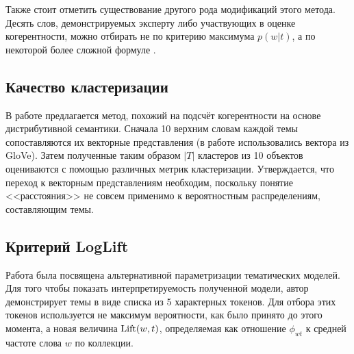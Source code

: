 Также стоит отметить существование другого рода модификаций этого метода. Десять слов, демонстрируемых эксперту либо участвующих в оценке когерентности, можно отбирать не по критерию максимума $p(w|t)$, а по некоторой более сложной формуле \cite{Blei_lafferty,ldavis2014,boydcare,frex}.





\subsection{Качество кластеризации}

В работе \cite{krasnov19clustering} предлагается метод, похожий на подсчёт когерентности на основе дистрибутивной семантики. Сначала 10 верхним словам каждой темы сопоставляются их векторные представления (в работе использовались вектора из GloVe). Затем полученные таким образом $|T|$ кластеров из 10 объектов оцениваются с помощью различных метрик кластеризации. Утверждается, что переход к векторным представлениям необходим, поскольку понятие <<расстояния>> не совсем применимо к вероятностным распределениям, составляющим темы.


\subsection{Критерий LogLift}
Работа \cite{taddy2012estimation} была посвящена альтернативной параметризации тематических моделей. Для того чтобы показать интерпретируемость полученной модели, автор демонстрирует темы в виде списка из 5 характерных токенов. Для отбора этих токенов используется не максимум вероятности, как было принято до этого момента, а новая величина $\textup{Lift}(w, t)$, определяемая как отношение $\phi_{wt}$ к средней частоте слова $w$ по коллекции.

